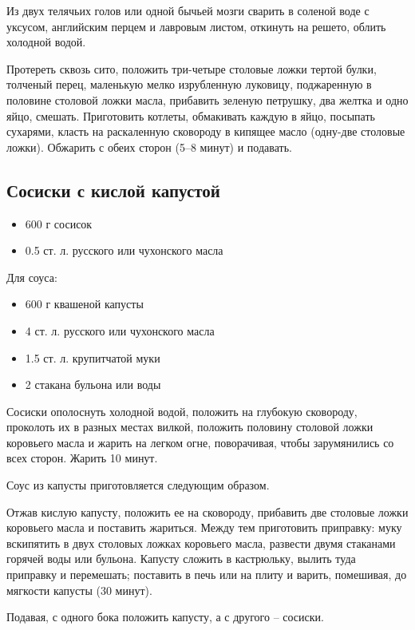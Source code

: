 Из двух телячьих голов или одной бычьей мозги сварить в соленой воде с уксусом, английским перцем и лавровым листом, откинуть на решето, облить холодной водой.

Протереть сквозь сито, положить три-четыре столовые ложки тертой булки, толченый перец, маленькую мелко изрубленную луковицу, поджаренную в половине столовой ложки масла, прибавить зеленую петрушку, два желтка и одно яйцо, смешать. Приготовить котлеты, обмакивать каждую в яйцо, посыпать сухарями, класть на раскаленную сковороду в кипящее масло (одну-две столовые ложки). Обжарить с обеих сторон (5–8 минут) и подавать.

\subsection{Сосиски с кислой капустой}

\begin{itemize}
	\item 600 г сосисок 
    \item 0.5 ст. л. русского или чухонского масла
\end{itemize}

Для соуса: 

\begin{itemize} 
	\item 600 г квашеной капусты 
    \item 4 ст. л. русского или чухонского масла 
    \item 1.5 ст. л. крупитчатой муки 
    \item 2 стакана бульона или воды
\end{itemize}

Сосиски ополоснуть холодной водой, положить на глубокую сковороду, проколоть их в разных местах вилкой, положить половину столовой ложки коровьего масла и жарить на легком огне, поворачивая, чтобы зарумянились со всех сторон. Жарить 10 минут.

Соус из капусты приготовляется следующим образом.

Отжав кислую капусту, положить ее на сковороду, прибавить две столовые ложки коровьего масла и поставить жариться. Между тем приготовить приправку: муку вскипятить в двух столовых ложках коровьего масла, развести двумя стаканами горячей воды или бульона. Капусту сложить в кастрюльку, вылить туда приправку и перемешать; поставить в печь или на плиту и варить, помешивая, до мягкости капусты (30 минут).

Подавая, с одного бока положить капусту, а с другого – сосиски.

